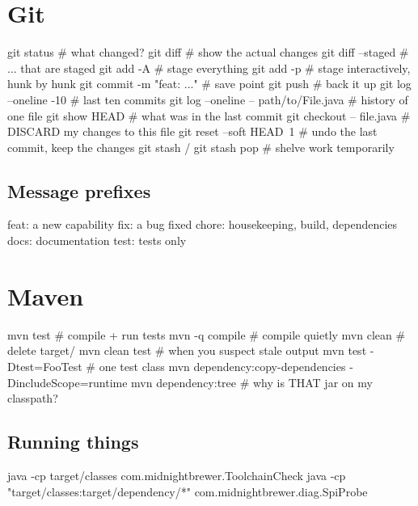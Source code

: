 \section{Git}

\begin{shell}
git status                    # what changed?
git diff                      # show the actual changes
git diff --staged             # ... that are staged
git add -A                    # stage everything
git add -p                    # stage interactively, hunk by hunk
git commit -m "feat: ..."     # save point
git push                      # back it up
git log --oneline -10         # last ten commits
git log --oneline -- path/to/File.java     # history of one file
git show HEAD                 # what was in the last commit
git checkout -- file.java     # DISCARD my changes to this file
git reset --soft HEAD~1       # undo the last commit, keep the changes
git stash / git stash pop     # shelve work temporarily
\end{shell}

\subsection*{Message prefixes}

\begin{trace}
feat:   a new capability
fix:    a bug fixed
chore:  housekeeping, build, dependencies
docs:   documentation
test:   tests only
\end{trace}

\section{Maven}

\begin{shell}
mvn test                      # compile + run tests
mvn -q compile                # compile quietly
mvn clean                     # delete target/
mvn clean test                # when you suspect stale output
mvn test -Dtest=FooTest       # one test class
mvn dependency:copy-dependencies -DincludeScope=runtime
mvn dependency:tree           # why is THAT jar on my classpath?
\end{shell}

\subsection*{Running things}

\begin{shell}
java -cp target/classes com.midnightbrewer.ToolchainCheck
java -cp "target/classes:target/dependency/*" com.midnightbrewer.diag.SpiProbe
\end{shell}

